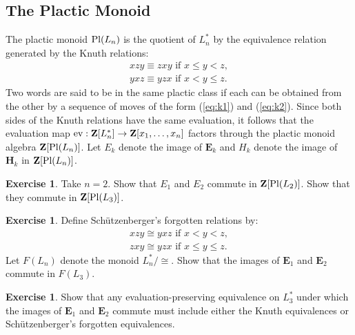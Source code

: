 \documentclass[11pt]{amsproc}
\theoremstyle{definition}
\theoremstyle{example}
\newtheorem{exercise}[theorem]{Exercise}
\newcommand{\ev}{\textup{ev}}
\newcommand{\pl}{\textup{Pl}}
\begin{document}
\subsection{The Plactic Monoid}
\label{sec:plactic-monoid}
The plactic monoid $\pl(L_n)$ is the quotient of $L^*_n$ by the equivalence relation generated by the Knuth relations:
\begin{gather}
  \tag{$K1$}\label{eq:k1}
  xzy \equiv zxy \text{ if } x\leq y < z,
  \\
  \tag{$K2$}\label{eq:k2}
  yxz \equiv yzx \text{ if } x < y \leq z.
\end{gather}
Two words are said to be in the same plactic class if each can be obtained from the other by a sequence of moves of the form (\ref{eq:k1}) and (\ref{eq:k2}).
Since both sides of the Knuth relations have the same evaluation, it follows that the evaluation map $\ev:\mathbf Z[L^*_n]\to \mathbf Z[x_1,\dotsc,x_n]$ factors through the plactic monoid algebra $\mathbf Z[\pl(L_n)]$.
Let $E_k$ denote the image of $\mathbf E_k$ and $H_k$ denote the image of $\mathbf H_k$ in $\mathbf Z[\pl(L_n)]$.
\begin{exercise}
  Take $n=2$.
  Show that $E_1$ and $E_2$ commute in $\mathbf Z[\pl(L_2)]$.
  Show that they commute in $\mathbf Z[\pl(L_3)]$.
\end{exercise}
\begin{exercise}
  \label{exercise:forgotten}
  Define Sch\"utzenberger's forgotten relations by:
  \begin{gather}
    \tag{$F1$}\label{eq:f1}
    xzy \cong yxz \text{ if } x < y < z,
    \\
    \tag{$F2$}\label{eq:f2}
    zxy \cong yzx \text{ if } x \leq y \leq z.
  \end{gather}
  Let $F(L_n)$ denote the monoid $L_n^*/\cong$.
  Show that the images of $\mathbf E_1$ and $\mathbf E_2$ commute in $F(L_3)$.
\end{exercise}
\begin{exercise}
  Show that any evaluation-preserving equivalence on $L_3^*$ under which the images of $\mathbf E_1$ and $\mathbf E_2$ commute must include either the Knuth equivalences or Sch\"utzenberger's forgotten equivalences.
\end{exercise}
\end{document}
